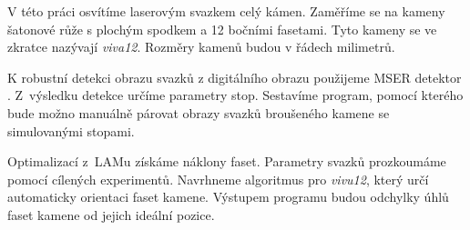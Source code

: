  	V této práci osvítíme laserovým svazkem celý kámen. Zaměříme se na kameny šatonové růže s plochým spodkem a 12 bočními fasetami. Tyto kameny se ve zkratce nazývají \textit{viva12}. Rozměry kamenů budou v řádech milimetrů. 
	
	K robustní detekci obrazu svazků z digitálního obrazu použijeme MSER detektor \cite{Matas}. Z~výsledku detekce určíme parametry stop. Sestavíme program, pomocí kterého bude možno manuálně párovat obrazy svazků broušeného kamene se simulovanými stopami.
	
 Optimalizací z~LAMu získáme náklony faset. Parametry svazků prozkoumáme pomocí cílených experimentů. Navrhneme algoritmus pro \textit{vivu12}, který určí automaticky orientaci faset kamene. Výstupem programu budou odchylky úhlů faset kamene od jejich ideální pozice.




 
 
 
 \clearpage
 